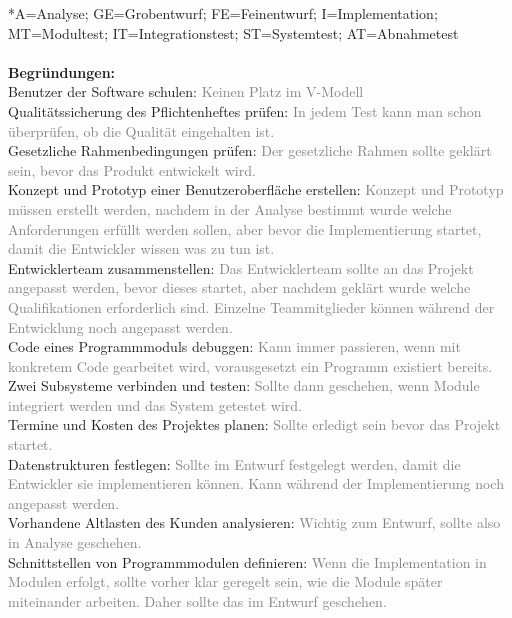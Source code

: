 \documentclass[a4paper,11pt]{scrartcl}
\begin{document}
	*A=Analyse; GE=Grobentwurf; FE=Feinentwurf; I=Implementation; MT=Modultest; IT=Integrationstest; ST=Systemtest; AT=Abnahmetest\\
	\\\textbf{Begründungen:}\\
	Benutzer der Software schulen: \textcolor{gray}{Keinen Platz im V-Modell}\\
	Qualitätssicherung des Pflichtenheftes prüfen: \textcolor{gray}{In jedem Test kann man schon überprüfen, ob die Qualität eingehalten ist.}\\
	Gesetzliche Rahmenbedingungen prüfen: \textcolor{gray}{Der gesetzliche Rahmen sollte geklärt sein, bevor das Produkt entwickelt wird.}\\
	Konzept und Prototyp einer Benutzeroberfläche erstellen: \textcolor{gray}{Konzept und Prototyp müssen erstellt werden, nachdem in der Analyse bestimmt wurde welche Anforderungen erfüllt werden sollen, aber bevor die Implementierung startet, damit die Entwickler wissen was zu tun ist.} \\
	Entwicklerteam zusammenstellen: \textcolor{gray}{Das Entwicklerteam sollte an das Projekt angepasst werden, bevor dieses startet, aber nachdem geklärt wurde welche Qualifikationen erforderlich sind. Einzelne Teammitglieder können während der Entwicklung noch angepasst werden.}\\
	Code eines Programmmoduls debuggen: \textcolor{gray}{Kann immer passieren, wenn mit konkretem Code gearbeitet wird, vorausgesetzt ein Programm existiert bereits.}\\			
 	Zwei Subsysteme verbinden und testen: \textcolor{gray}{Sollte dann geschehen, wenn Module integriert werden und das System getestet wird.}\\			
 	Termine und Kosten des Projektes planen: \textcolor{gray}{Sollte erledigt sein bevor das Projekt startet.}\\
	Datenstrukturen festlegen: \textcolor{gray}{Sollte im Entwurf festgelegt werden, damit die Entwickler sie implementieren können. Kann während der Implementierung noch angepasst werden.}\\				
	Vorhandene Altlasten des Kunden analysieren: \textcolor{gray}{Wichtig zum Entwurf, sollte also in Analyse geschehen.}\\			
	Schnittstellen von Programmmodulen definieren: \textcolor{gray}{Wenn die Implementation in Modulen erfolgt, sollte vorher klar geregelt sein, wie die Module später miteinander arbeiten. Daher sollte das im Entwurf geschehen.}\\			
\end{document}
